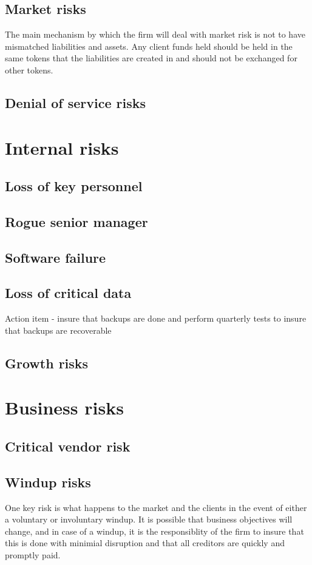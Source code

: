 \subsection{Market risks}

The main mechanism by which the firm will deal with market risk is not
to have mismatched liabilities and assets.  Any client funds held
should be held in the same tokens that the liabilities are created in
and should not be exchanged for other tokens.

\subsection{Denial of service risks}
\section{Internal risks}
\subsection{Loss of key personnel}
\subsection{Rogue senior manager}
\subsection{Software failure}
\subsection{Loss of critical data}

Action item - insure that backups are done and perform quarterly tests
to insure that backups are recoverable

\subsection{Growth risks}

\section{Business risks}
\subsection{Critical vendor risk}
\subsection{Windup risks}

One key risk is what happens to the market and the clients in the
event of either a voluntary or involuntary windup.  It is possible
that business objectives will change, and in case of a windup, it is
the responsiblity of the firm to insure that this is done with
minimial disruption and that all creditors are quickly and promptly
paid.
